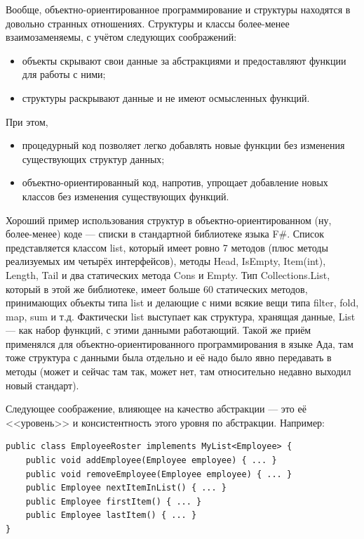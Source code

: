 \documentclass{../../text-style}
\begin{document}
Вообще, объектно-ориентированное программирование и структуры находятся в довольно странных отношениях. Структуры и классы более-менее взаимозаменяемы, с учётом следующих соображений:

\begin{itemize}
    \item объекты скрывают свои данные за абстракциями и предоставляют функции для работы с ними;
    \item структуры раскрывают данные и не имеют осмысленных функций.
\end{itemize}

При этом,
\begin{itemize}
    \item процедурный код позволяет легко добавлять новые функции без изменения существующих структур данных;
    \item объектно-ориентированный код, напротив, упрощает добавление новых классов без изменения существующих функций.
\end{itemize}

Хороший пример использования структур в объектно-ориентированном (ну, более-менее) коде --- списки в стандартной библиотеке языка F\#. Список представляется классом list, который имеет ровно 7 методов (плюс методы реализуемых им четырёх интерфейсов), методы Head, IsEmpty, Item(int), Length, Tail и два статических метода Cons и Empty. Тип Collections.List, который в этой же библиотеке, имеет больше 60 статических методов, принимающих объекты типа list и делающие с ними всякие вещи типа filter, fold, map, sum и т.д. Фактически list выступает как структура, хранящая данные, List --- как набор функций, с этими данными работающий. Такой же приём применялся для объектно-ориентированного программирования в языке Ада, там тоже структура с данными была отдельно и её надо было явно передавать в методы (может и сейчас там так, может нет, там относительно недавно выходил новый стандарт).

Следующее соображение, влияющее на качество абстракции --- это её <<уровень>> и консистентность этого уровня по абстракции. Например:

\begin{verbatim}
public class EmployeeRoster implements MyList<Employee> {
    public void addEmployee(Employee employee) { ... }
    public void removeEmployee(Employee employee) { ... }
    public Employee nextItemInList() { ... }
    public Employee firstItem() { ... }
    public Employee lastItem() { ... }
}
\end{verbatim}
\end{document}
